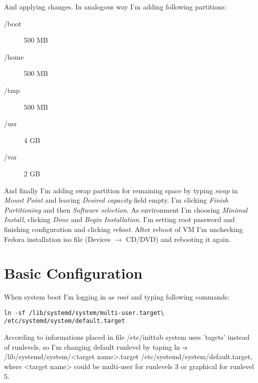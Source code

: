 \documentclass[a4paper,12pt]{article}
\begin{document}
    And applying changes. In analogous way I'm adding following partitions:
    \begin{description}
        \item [/boot] 500 MB
        \item [/home] 500 MB
        \item [/tmp] 500 MB
        \item [/usr] 4 GB
        \item [/var] 2 GB
    \end{description}
    And finally I'm adding swap partition for remaining space by typing \emph{swap} in \emph{Mount Point} and leaving \emph{Desired capacity} field empty.
    I'm clicking \emph{Finish Partitioning} and then \emph{Software selection}. As environment I'm choosing \emph{Minimal Install}, clicking \emph{Done} and \emph{Begin Installation}.
    I'm setting root password and finishing configuration and clicking \emph{reboot}. After reboot of VM I'm unchecking Fedora installation iso file (Devices $\rightarrow$ CD/DVD) and rebooting it again. 
    
    \section{Basic Configuration}
    
    When system boot I'm logging in as \emph{root} and typing following commands: 
    \lstset{showspaces=true,
            language=sh,
            numbers=left,
            upquote=true}
\begin{lstlisting}[frame=single]
ln -sf /lib/systemd/system/multi-user.target\
/etc/systemd/system/default.target
\end{lstlisting}

According to informations placed in file /etc/inittab system uses 'tagets' instead of runlevels, so I'm changing default runlevel by taping ln -s /lib/systemd/system/<target name>.target 
/etc/systemd/system/default.target, where <target name> could be multi-user for runlevels 3 or graphical for runlevel 5. 
\end{document}
